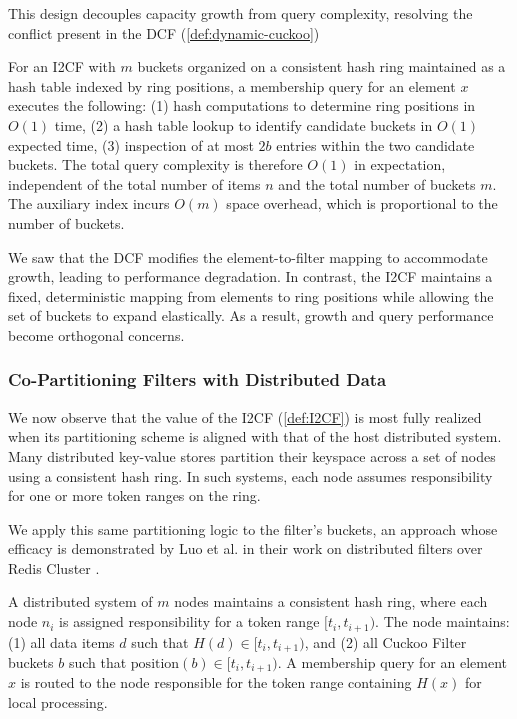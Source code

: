 This design decouples capacity growth from query complexity, resolving the conflict present in the DCF (\ref{def:dynamic-cuckoo})

\begin{theorem}
    For an I2CF with $m$ buckets organized on a consistent hash ring maintained as a hash table indexed by ring positions, a membership query for an element $x$ executes the following: (1) hash computations to determine ring positions in $O(1)$ time, (2) a hash table lookup to identify candidate buckets in $O(1)$ expected time, (3) inspection of at most $2b$ entries within the two candidate buckets. The total query complexity is therefore $O(1)$ in expectation, independent of the total number of items $n$ and the total number of buckets $m$. The auxiliary index incurs $O(m)$ space overhead, which is proportional to the number of buckets.
\end{theorem}

We saw that the DCF modifies the element-to-filter mapping to accommodate growth, leading to performance degradation. In contrast, the I2CF maintains a fixed, deterministic mapping from elements to ring positions while allowing the set of buckets to expand elastically. As a result, growth and query performance become orthogonal concerns.

\subsubsection{Co-Partitioning Filters with Distributed Data} \label{subsubsec:co-partitioning}

We now observe that the value of the I2CF (\ref{def:I2CF}) is most fully realized when its partitioning scheme is aligned with that of the host distributed system. Many distributed key-value stores partition their keyspace across a set of nodes using a consistent hash ring. In such systems, each node assumes responsibility for one or more token ranges on the ring.

We apply this same partitioning logic to the filter's buckets, an approach whose efficacy is demonstrated by Luo et al. in their work on distributed filters over Redis Cluster \cite{Luo2018DistributedDC}.

\begin{definition}
    A distributed system of $m$ nodes maintains a consistent hash ring, where each node $n_i$ is assigned responsibility for a token range $[t_i, t_{i+1})$. The node maintains: (1) all data items $d$ such that $H(d) \in [t_i, t_{i+1})$, and (2) all Cuckoo Filter buckets $b$ such that $\text{position}(b) \in [t_i, t_{i+1})$. A membership query for an element $x$ is routed to the node responsible for the token range containing $H(x)$ for local processing.
\end{definition}

